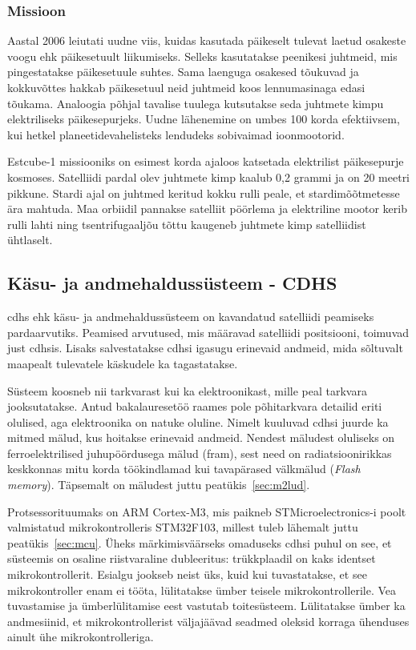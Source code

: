 \documentclass[12pt,a4paper]{article}
\begin{document}
\subsubsection{Missioon}
Aastal 2006 leiutati uudne viis, kuidas kasutada päikeselt tulevat laetud
osakeste voogu ehk päikesetuult liikumiseks. Selleks kasutatakse peenikesi
juhtmeid, mis pingestatakse päikesetuule suhtes. Sama laenguga osakesed tõukuvad
ja kokkuvõttes hakkab päikesetuul neid juhtmeid koos lennumasinaga edasi
tõukama. Analoogia põhjal tavalise tuulega kutsutakse seda juhtmete kimpu
elektriliseks päikesepurjeks. Uudne lähenemine on umbes 100 korda efektiivsem,
kui hetkel planeetidevahelisteks lendudeks sobivaimad ioonmootorid.
\cite{errpuri}

Estcube-1 missiooniks on esimest korda ajaloos katsetada elektrilist
päikesepurje kosmoses. Satelliidi pardal olev juhtmete kimp kaalub 0,2 grammi ja
on 20 meetri pikkune. Stardi ajal on juhtmed keritud kokku rulli peale, et
stardimõõtmetesse ära mahtuda. Maa orbiidil pannakse satelliit pöörlema ja
elektriline mootor kerib rulli lahti ning tsentrifugaaljõu tõttu kaugeneb
juhtmete kimp satelliidist ühtlaselt.
\subsection{Käsu- ja andmehaldussüsteem - CDHS}
\gls{cdhs} ehk käsu- ja andmehaldussüsteem on kavandatud satelliidi peamiseks
pardaarvutiks. Peamised arvutused, mis määravad satelliidi positsiooni, toimuvad
just \gls{cdhs}is. Lisaks salvestatakse \gls{cdhs}i igasugu erinevaid andmeid,
mida sõltuvalt maapealt tulevatele käskudele ka tagastatakse.

Süsteem koosneb nii tarkvarast kui ka elektroonikast, mille peal tarkvara
jooksutatakse. Antud bakalauresetöö raames pole põhitarkvara detailid eriti
olulised, aga elektroonika on natuke oluline. Nimelt kuuluvad \gls{cdhs}i juurde
ka mitmed mälud, kus hoitakse erinevaid andmeid. Nendest mäludest oluliseks on
ferroelektrilised juhupöördusega mälud (\gls{fram}), sest need on
radiatsioonirikkas keskkonnas mitu korda töökindlamad kui tavapärased välkmälud
(\textit{Flash memory}). Täpsemalt on mäludest juttu peatükis~\ref{sec:m2lud}.

Protsessorituumaks on ARM Cortex-M3, mis paikneb STMicroelectronics-i poolt
valmistatud mikrokontrolleris STM32F103, millest tuleb lähemalt juttu
peatükis~\ref{sec:mcu}. Üheks märkimisväärseks omaduseks \gls{cdhs}i puhul on see, et
süsteemis on osaline riistvaraline dubleeritus: trükkplaadil on kaks identset
mikrokontrollerit. Esialgu jookseb neist üks, kuid kui tuvastatakse, et see
mikrokontroller enam ei tööta, lülitatakse ümber teisele mikrokontrollerile.
Vea tuvastamise ja ümberlülitamise eest vastutab toitesüsteem. Lülitatakse
ümber ka andmesiinid, et mikrokontrollerist väljajäävad seadmed oleksid korraga
ühenduses ainult ühe mikrokontrolleriga.
\end{document}

